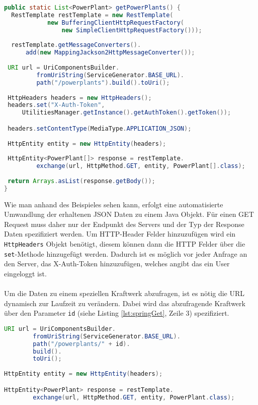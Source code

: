 \begin{lstlisting}[language=java, caption={GET Request um alle Kraftwerke zu erhalten},label=lst:getAllPowerPlants, frame=single, tabsize=3]
public static List<PowerPlant> getPowerPlants() {
  RestTemplate restTemplate = new RestTemplate(
			new BufferingClientHttpRequestFactory(
				new SimpleClientHttpRequestFactory()));
				  
  restTemplate.getMessageConverters().
	  add(new MappingJackson2HttpMessageConverter());
 
 URI url = UriComponentsBuilder.
		 fromUriString(ServiceGenerator.BASE_URL).
		 path("/powerplants").build().toUri();
 
 HttpHeaders headers = new HttpHeaders();
 headers.set("X-Auth-Token", 
	 UtilitiesManager.getInstance().getAuthToken().getToken());

 headers.setContentType(MediaType.APPLICATION_JSON);
 
 HttpEntity entity = new HttpEntity(headers);
 
 HttpEntity<PowerPlant[]> response = restTemplate.
		 exchange(url, HttpMethod.GET, entity, PowerPlant[].class);
 
 return Arrays.asList(response.getBody());
}
\end{lstlisting}

Wie man anhand des Beispieles sehen kann, erfolgt eine automatisierte Umwandlung der erhaltenen JSON Daten zu einem Java Objekt. Für einen GET Request muss daher nur der Endpunkt des Servers und der Typ der Response Daten spezifiziert werden. Um HTTP-Header Felder hinzuzufügen wird ein \texttt{HttpHeaders} Objekt benötigt, diesem können dann die HTTP Felder über die \texttt{set}-Methode hinzugefügt werden. Dadurch ist es möglich vor jeder Anfrage an den Server, das X-Auth-Token hinzuzufügen, welches angibt das ein User eingeloggt ist.
\\\\
Um die Daten zu einem speziellen Kraftwerk abzufragen, ist es nötig die URL dynamisch zur Laufzeit zu verändern. Dabei wird das abzufragende Kraftwerk über den Parameter \texttt{id} (siehe Listing \ref{lst:springGet}, Zeile 3) spezifiziert.

\begin{lstlisting}[language=java, caption={Abfrage der Daten zu einem speziellen Kraftwerke},label={lst:springGet}, frame=single]
URI url = UriComponentsBuilder.
		fromUriString(ServiceGenerator.BASE_URL).
		path("/powerplants/" + id).
		build().
		toUri();
		
HttpEntity entity = new HttpEntity(headers);

HttpEntity<PowerPlant> response = restTemplate.
		exchange(url, HttpMethod.GET, entity, PowerPlant.class);		
		
\end{lstlisting}


